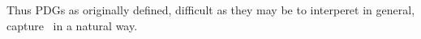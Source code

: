 {{%
    Thus PDGs as originally defined, difficult as they may be to interperet in general, capture \scibility\ in a natural way.
}

%
}
